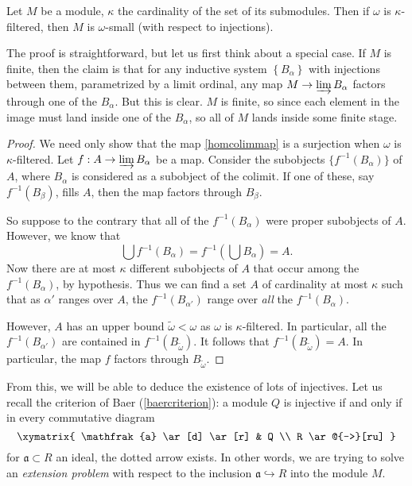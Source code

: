 \begin{proposition} \label{modulesaresmall}
Let $M$ be a module, $\kappa$ the cardinality of the set of its submodules.
Then if $\omega$ is $\kappa$-filtered, then $M$ is $\omega$-small (with
respect to injections).
\end{proposition} 

The proof is straightforward, but let us first think about a special case. If
$M$ is finite, then the claim is that for any inductive system
$\left\{B_\alpha\right\}$ with injections between them, parametrized by a
limit ordinal, any map $M \to
\varinjlim B_\alpha$ factors through one of the $B_\alpha$. But this is clear. 
$M$ is finite, so since each element in the image must land inside one of the
$B_\alpha$, so all of $M$ lands inside some finite stage.
\begin{proof} 
We need only show that the map \cref{homcolimmap} is a surjection when
$\omega$ is $\kappa$-filtered.
Let $f: A \to \varinjlim B_\alpha$ be a map.
Consider the subobjects $\{f^{-1}(B_\alpha)\}$ of $A$, where $B_\alpha$ is considered as a
subobject of the colimit. If one of these, say $f^{-1}(B_\beta)$, fills $A$,
then the map factors through $B_\beta$.

So suppose to the contrary that all of the $f^{-1}(B_\alpha)$ were proper
subobjects of $A$.
However, we know that
\[ \bigcup f^{-1}(B_\alpha) = f^{-1}\left(\bigcup B_\alpha\right) = A.  \]
Now there are at most $\kappa$ different subobjects of $A$ that occur among
the $f^{-1}(B_\alpha)$, by hypothesis. 
Thus we can find a set $A$ of cardinality at most $\kappa$ such that as
$\alpha'$ ranges over $A$, the
$f^{-1}(B_{\alpha'})$ range over \emph{all} the $f^{-1}(B_\alpha)$.

However, $A$ has an upper bound $\widetilde{\omega} < \omega$ as $\omega$ is
$\kappa$-filtered. In particular,
all the $f^{-1}(B_{\alpha'})$ are contained in
$f^{-1}(B_{\widetilde{\omega}})$. It follows that
$f^{-1}(B_{\widetilde{\omega}}) = A$. 
In particular, the map $f$ factors through $B_{\widetilde{\omega}}$.
\end{proof} 

From this, we will be able to deduce the existence of lots of injectives.
Let us recall the criterion of Baer (\cref{baercriterion}): a module $Q$ is
injective if and only if in every commutative diagram
\[ \xymatrix{
\mathfrak{a} \ar[d]  \ar[r] &  Q \\
R \ar@{-->}[ru]
}\]
for $\mathfrak{a} \subset R$ an ideal, the dotted arrow exists. In other
words, we are trying to solve an \emph{extension problem} with respect to the
inclusion $\mathfrak{a} \hookrightarrow R$ into the module $M$.


